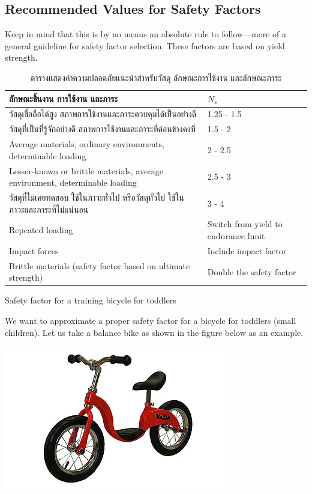 \documentclass[a4paper,openany,12pt]{book}
\begin{document}
\subsection{Recommended Values for Safety Factors}
\label{recommended-values-for-safety-factors}
Keep in mind that this is by no means an absolute rule to follow---more
of a general guideline for safety factor selection. These factors are
based on yield strength.

\begin{table}[htbp]
\caption{\label{table: safety factor guideline}ตารางแสดงค่าความปลอดภัยแนะนำสำหรับวัสดุ ลักษณะการใช้งาน และลักษณะภาระ}
\centering
\begin{tabular}{ll}
\toprule
ลักษณะชิ้นงาน การใช้งาน และภาระ & \(N_s\)\\
\midrule
วัสดุเชื่อถือได้สูง สภาพการใช้งานและภาระควบคุมได้เป็นอย่างดี & 1.25 - 1.5\\
วัสดุที่เป็นที่รู้จักอย่างดี สภาพการใช้งานและภาระที่ค่อนข้างคงที่ & 1.5 - 2\\
Average materials, ordinary environments, determinable loading & 2 - 2.5\\
Lesser-known or brittle materials, average environment, determinable loading & 2.5 - 3\\
วัสดุที่ไม่เคยทดสอบ ใช้ในภาวะทั่วไป หรือวัสดุทั่วไป ใช้ในภาวะและภาระที่ไม่แน่นอน & 3 - 4\\
Repeated loading & Switch from yield to endurance limit\\
Impact forces & Include impact factor\\
Brittle materials (safety factor based on ultimate strength) & Double the safety factor\\
\bottomrule
\end{tabular}
\end{table}

Safety factor for a training bicycle for toddlers

We want to approximate a proper safety factor for a bicycle for toddlers
(small children). Let us take a balance bike as shown in the figure
below as an example.


\begin{center}
\includegraphics[width=.9\linewidth]{pictures/intro-eng-design/balance-bike.jpg}
\end{center}
\end{document}

